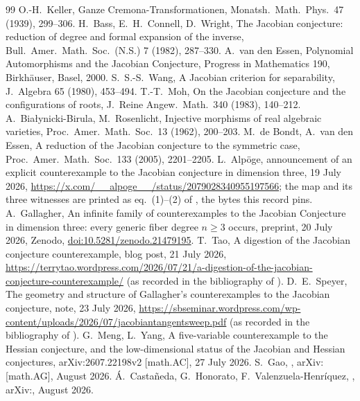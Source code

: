 \documentclass[11pt]{article}
\begin{document}
\begin{thebibliography}{99}\small
{} O.-H.~Keller, Ganze Cremona-Transformationen, Monatsh.\ Math.\ Phys.\ 47 (1939), 299--306.
 H.~Bass, E.~H.~Connell, D.~Wright, The Jacobian conjecture: reduction of degree and formal expansion of the inverse, Bull.\ Amer.\ Math.\ Soc.\ (N.S.) 7 (1982), 287--330.
 A.~van den Essen, Polynomial Automorphisms and the Jacobian Conjecture, Progress in Mathematics 190, Birkh\"auser, Basel, 2000.
 S.~S.-S.~Wang, A Jacobian criterion for separability, J.\ Algebra 65 (1980), 453--494.
 T.-T.~Moh, On the Jacobian conjecture and the configurations of roots, J.\ Reine Angew.\ Math.\ 340 (1983), 140--212.
 A.~Bia{\l}ynicki-Birula, M.~Rosenlicht, Injective morphisms of real algebraic varieties, Proc.\ Amer.\ Math.\ Soc.\ 13 (1962), 200--203.
 M.~de Bondt, A.~van den Essen, A reduction of the Jacobian conjecture to the symmetric case, Proc.\ Amer.\ Math.\ Soc.\ 133 (2005), 2201--2205.
 L.~Alp\"oge, announcement of an explicit counterexample to the Jacobian conjecture in dimension three, 19 July 2026, \url{https://x.com/__alpoge__/status/2079028340955197566}; the map and its three witnesses are printed as eq.\ (1)--(2) of \cite{MengYang2026}, the bytes this record pins.
 A.~Gallagher, An infinite family of counterexamples to the Jacobian Conjecture in dimension three: every generic fiber degree $n\ge3$ occurs, preprint, 20 July 2026, Zenodo, \href{https://doi.org/10.5281/zenodo.21479195}{doi:10.5281/zenodo.21479195}.
 T.~Tao, A digestion of the Jacobian conjecture counterexample, blog post, 21 July 2026, \url{https://terrytao.wordpress.com/2026/07/21/a-digestion-of-the-jacobian-conjecture-counterexample/} (as recorded in the bibliography of \cite{Gao2026}).
 D.~E.~Speyer, The geometry and structure of Gallagher's counterexamples to the Jacobian conjecture, note, 23 July 2026, \url{https://sbseminar.wordpress.com/wp-content/uploads/2026/07/jacobiantangentsweep.pdf} (as recorded in the bibliography of \cite{Gao2026}).
 G.~Meng, L.~Yang, A five-variable counterexample to the Hessian conjecture, and the low-dimensional status of the Jacobian and Hessian conjectures, arXiv:2607.22198v2 [math.AC], 27 July 2026.
 S.~Gao, \GaoTitle, arXiv:\GaoArxiv{} [math.AG], August 2026.
 \'A.~Casta\~neda, G.~Honorato, F.~Valenzuela-Henr\'iquez, \ChvTitle, arXiv:\ChvArxiv, August 2026.

\end{thebibliography}
\end{document}
